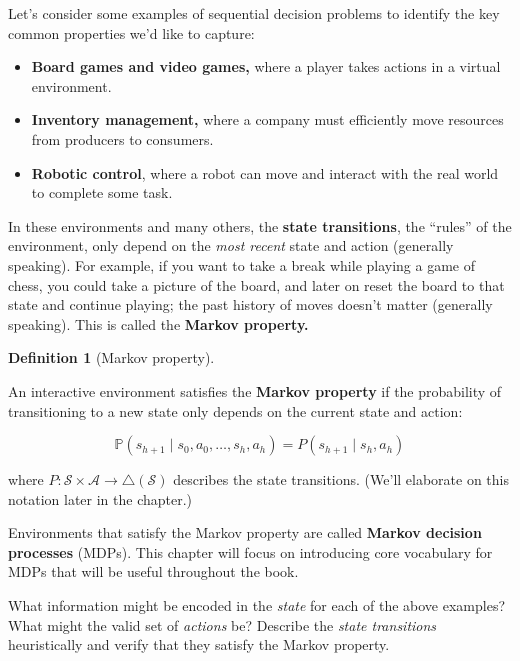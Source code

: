 \documentclass[
  letterpaper,
  DIV=11,
  numbers=noendperiod]{scrreprt}
\providecommand{\tightlist}{%
  \setlength{\itemsep}{0pt}\setlength{\parskip}{0pt}}\usepackage{longtable,booktabs,array}
\theoremstyle{plain}
\theoremstyle{plain}
\theoremstyle{definition}
\theoremstyle{definition}
\newtheorem{definition}{Definition}[chapter]
\theoremstyle{remark}
\begin{document}
Let's consider some examples of sequential decision problems to identify
the key common properties we'd like to capture:

\begin{itemize}
\tightlist
\item
  \textbf{Board games and video games,} where a player takes actions in
  a virtual environment.
\item
  \textbf{Inventory management,} where a company must efficiently move
  resources from producers to consumers.
\item
  \textbf{Robotic control}, where a robot can move and interact with the
  real world to complete some task.
\end{itemize}

In these environments and many others, the \textbf{state transitions},
the ``rules'' of the environment, only depend on the \emph{most recent}
state and action (generally speaking). For example, if you want to take
a break while playing a game of chess, you could take a picture of the
board, and later on reset the board to that state and continue playing;
the past history of moves doesn't matter (generally speaking). This is
called the \textbf{Markov property.}

\begin{definition}[Markov
property]\protect\hypertarget{def-markov}{}\label{def-markov}

An interactive environment satisfies the \textbf{Markov property} if the
probability of transitioning to a new state only depends on the current
state and action:

\[\mathbb{P}(s_{h+1} \mid s_0, a_0, \dots, s_h, a_h) = P(s_{h+1} \mid s_h, a_h)\]

where \(P : \mathcal{S} \times \mathcal{A} \to \triangle(\mathcal{S})\)
describes the state transitions. (We'll elaborate on this notation later
in the chapter.)

\end{definition}

Environments that satisfy the Markov property are called \textbf{Markov
decision processes} (MDPs). This chapter will focus on introducing core
vocabulary for MDPs that will be useful throughout the book.

What information might be encoded in the \emph{state} for each of the
above examples? What might the valid set of \emph{actions} be? Describe
the \emph{state transitions} heuristically and verify that they satisfy
the Markov property.
\end{document}
